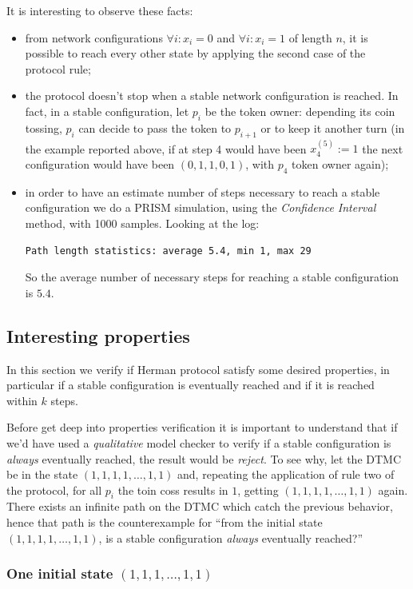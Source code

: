 It is interesting to observe these facts:
\begin{itemize}
\item from network configurations $\forall i:x_i=0$ and $\forall
  i:x_i=1$ of length $n$, it is possible to reach every other state by
  applying the second case of the protocol rule;
\item the protocol doesn't stop when a stable network configuration is
  reached. In fact, in a stable configuration, let $p_i$ be the token
  owner: depending its coin tossing, $p_i$ can decide to pass the
  token to $p_{i+1}$ or to keep it another turn (in the example
  reported above, if at step 4 would have been $x_4^{(5)}:= 1$ the
  next configuration would have been $(0, 1, 1, 0, 1)$, with $p_4$
  token owner again);
\item in order to have an estimate number of steps necessary to reach
  a stable configuration we do a PRISM simulation, using the
  \emph{Confidence Interval} method, with 1000 samples. Looking at the
  log:
\begin{verbatim}
Path length statistics: average 5.4, min 1, max 29
\end{verbatim}
  So the average number of necessary steps for reaching a stable
  configuration is $5.4$.
\end{itemize}

\subsection{Interesting properties}

In this section we verify if Herman protocol satisfy some desired
properties, in particular if a stable configuration is eventually
reached and if it is reached within $k$ steps.

Before get deep into properties verification it is important to
understand that if we'd have used a \emph{qualitative} model checker
to verify if a stable configuration is \emph{always} eventually
reached, the result would be \emph{reject}. To see why, let the DTMC
be in the state $(1,1,1,1,\ldots,1,1)$ and, repeating the application
of rule two of the protocol, for all $p_i$ the toin coss results in
$1$, getting $(1,1,1,1,\ldots,1,1)$ again. There exists an infinite
path on the DTMC which catch the previous behavior, hence that path is
the counterexample for ``from the initial state
$(1,1,1,1,\ldots,1,1)$, is a stable configuration \emph{always}
eventually reached?''

\subsubsection{One initial state $(1,1,1,\ldots,1,1)$}

